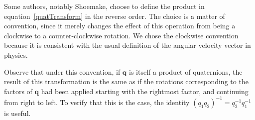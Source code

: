 Some authors, notably Shoemake, choose to define the product in equation~\ref{quatTransform} in
the reverse order. The choice is a matter of convention, since it merely changes the effect
of this operation from being a clockwise to a counter-clockwise rotation. We chose the clockwise
convention because it is consistent with the usual definition of the angular velocity vector
in physics.

Observe that under this convention, if $\mathbf{q}$ is itself a product of quaternions, the
result of this transformation is the same as if the rotations corresponding to the factors
of $\mathbf{q}$ had been applied starting with the rightmost factor, and continuing from
right to left. To verify that this is the case, the identity
$(q_1 q_2)^{-1} = q_2^{-1} q_1^{-1}$ is useful.

